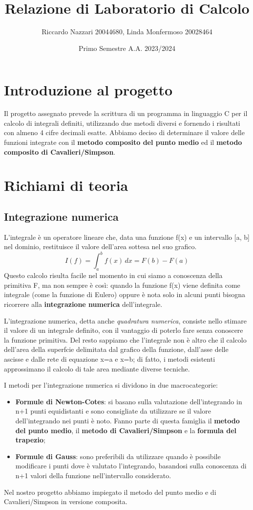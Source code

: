 \documentclass{article}
\title{Relazione di Laboratorio di Calcolo}
\author{Riccardo Nazzari 20044680, Linda Monfermoso 20028464}
\date{Primo Semestre A.A. 2023/2024}
\begin{document}
\maketitle

\section{Introduzione al progetto}
Il progetto assegnato prevede la scrittura di un programma in linguaggio C per il calcolo di integrali definiti,
utilizzando due metodi diversi e fornendo i risultati con almeno 4 cifre decimali esatte. Abbiamo deciso di determinare
il valore delle funzioni integrate con il \textbf{metodo composito del punto medio} ed il \textbf{metodo composito di Cavalieri/Simpson}.

\section{Richiami di teoria}
\subsection{Integrazione numerica}
L'integrale è un operatore lineare che, data una funzione f(x) e un intervallo [a, b] nel dominio, restituisce il valore 
dell'area sottesa nel suo grafico. 
\begin{equation*}
   I(f) =  \int_{a}^{b} f(x)\, dx = F(b) - F(a)
\end{equation*}
Questo calcolo risulta facile nel momento in cui siamo a conoscenza della primitiva F, ma non sempre è così: quando la funzione
f(x) viene definita come integrale (come la funzione di Eulero) oppure è nota solo in alcuni punti bisogna ricorrere alla
\textbf{integrazione numerica} dell'integrale.

L'integrazione numerica, detta anche \textit{quadratura numerica}, consiste nello stimare il valore di un integrale definito, 
con il vantaggio di poterlo fare senza conoscere la funzione primitiva. Del resto sappiamo che l'integrale non è altro che il calcolo 
dell'area della superfcie delimitata dal grafico della funzione, dall'asse delle ascisse e dalle rete di equazione x=a e x=b; di fatto, i 
metodi esistenti approssimano il calcolo di tale area mediante diverse tecniche.

I metodi per l'integrazione numerica si dividono in due macrocategorie:
\begin{itemize}
   \item \textbf{Formule di Newton-Cotes}: si basano sulla valutazione dell'integrando in n+1 punti equidistanti e sono consigliate da utilizzare se il valore dell'integrando  
   nei punti è noto. Fanno parte di questa famiglia il \textbf{metodo del punto medio}, il \textbf{metodo di Cavalieri/Simpson} e la \textbf{formula del trapezio};
   \item \textbf{Formule di Gauss}: sono preferibili da utilizzare quando è possibile modificare i punti dove è valutato l'integrando, basandosi 
   sulla conoscenza di n+1 valori della funzione nell'intervallo considerato.
\end{itemize}
Nel nostro progetto abbiamo impiegato il metodo del punto medio e di Cavalieri/Simpson in versione composita.
\end{document}
